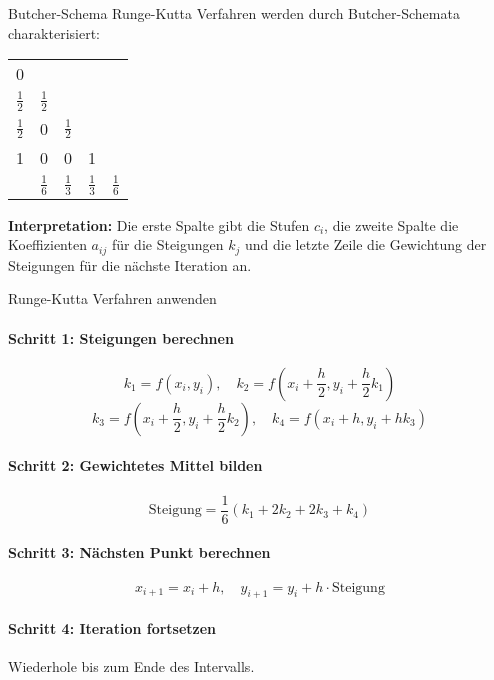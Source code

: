 \begin{concept}{Butcher-Schema}
    Runge-Kutta Verfahren werden durch Butcher-Schemata charakterisiert:

    \begin{minipage}{0.45\textwidth}
        \begin{center}
        \begin{tabular}{c|cccc}
        0 & & & & \\
        $\frac{1}{2}$ & $\frac{1}{2}$ & & & \\
        $\frac{1}{2}$ & 0 & $\frac{1}{2}$ & & \\
        1 & 0 & 0 & 1 & \\
        \hline
        & $\frac{1}{6}$ & $\frac{1}{3}$ & $\frac{1}{3}$ & $\frac{1}{6}$
        \end{tabular}
        \end{center}
    \end{minipage}
    \begin{minipage}{0.54\textwidth}
        \textbf{Interpretation:} Die erste Spalte gibt die Stufen $c_i$, 
        die zweite Spalte die Koeffizienten $a_{ij}$ für die Steigungen $k_j$ und die letzte Zeile die Gewichtung der Steigungen für die nächste Iteration an.
    \end{minipage}

\end{concept}

\begin{KR}{Runge-Kutta Verfahren anwenden}
\paragraph{Schritt 1: Steigungen berechnen}
\vspace{-2mm}
$$k_1 = f(x_i, y_i), \quad
k_2 = f(x_i + \frac{h}{2}, y_i + \frac{h}{2} k_1)$$
$$k_3 = f(x_i + \frac{h}{2}, y_i + \frac{h}{2} k_2), \quad
k_4 = f(x_i + h, y_i + h k_3)$$

\paragraph{Schritt 2: Gewichtetes Mittel bilden}
\vspace{-2mm}
$$\text{Steigung} = \frac{1}{6}(k_1 + 2k_2 + 2k_3 + k_4)$$

\paragraph{Schritt 3: Nächsten Punkt berechnen}
\vspace{-2mm}
$$x_{i+1} = x_i + h, \quad
y_{i+1} = y_i + h \cdot \text{Steigung}$$

\paragraph{Schritt 4: Iteration fortsetzen}
Wiederhole bis zum Ende des Intervalls.
\end{KR}


